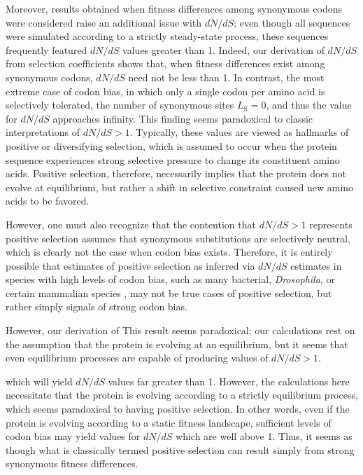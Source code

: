 \documentclass[11pt]{article}
\begin{document}
Moreover, results obtained when fitness differences among synonymous codons were considered raise an additional issue with $dN/dS$; even though all sequences were simulated according to a strictly steady-state process, these sequences frequently featured $dN/dS$ values greater than 1. Indeed, our derivation of $dN/dS$ from selection coefficients shows that, when fitness differences exist among synonymous codons, $dN/dS$ need not be less than 1. In contrast, the most extreme case of codon bias, in which only a single codon per amino acid is selectively tolerated, the number of synonymous sites $L_\text{S} = 0$, and thus the value for $dN/dS$ approaches infinity. This finding seems paradoxical to classic interpretations of $dN/dS >1$. Typically, these values are viewed as hallmarks of positive or diversifying selection, which is assumed to occur when the protein sequence experiences strong selective pressure to change its constituent amino acids. Positive selection, therefore, necessarily implies that the protein does not evolve at equilibrium, but rather a shift in selective constraint caused new amino acids to be favored. 

However, one must also recognize that the contention that $dN/dS > 1$ represents positive selection assumes that synonymous substitutions are selectively neutral, which is clearly not the case when codon bias exists. Therefore, it is entirely possible that estimates of positive selection as inferred via $dN/dS$ estimates in species with high levels of codon bias, such as many bacterial, \textit{Drosophila}, or certain mammalian species \cite{Chamaryetal2006, HershbergPetrov2008, PlotkinKudla2010}, may not be true cases of positive selection, but rather simply signals of strong codon bias.


However, our derivation of 
This result seems paradoxical; our calculations rest on the assumption that the protein is evolving at an equilibrium, but it seems that even equilibrium processes are capable of producing values of $dN/dS > 1$. 



 which will yield $dN/dS$ values far greater than 1. However, the calculations here necessitate that the protein is evolving according to a strictly equilibrium process, which seems paradoxical to having positive selection. In other words, even if the protein is evolving according to a static fitness landscape, sufficient levels of codon bias may yield values for $dN/dS$ which are well above 1. Thus, it seems as though what is classically termed positive selection can result simply from strong synonymous fitness differences.
 
\end{document}
